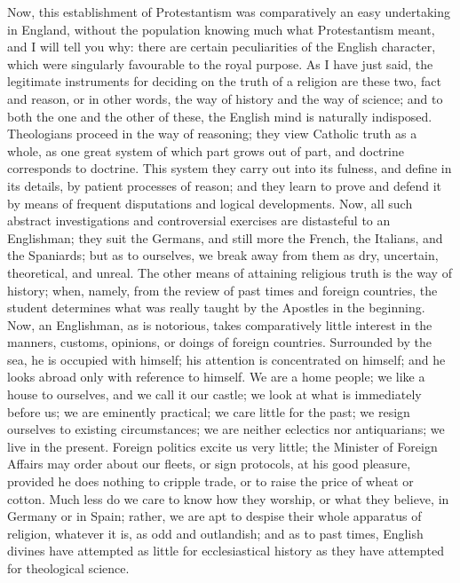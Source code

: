Now, this establishment of Protestantism was
comparatively an easy undertaking in England, without the
population knowing much what Protestantism meant, and I
will tell you why: there are certain peculiarities of the
English character, which were singularly favourable to
the royal purpose. As I have just said, the legitimate
instruments for deciding on the truth of a religion are
these two, fact and reason, or in other words, the way of
history and the way of science; and to both the one and
the other of these, the English mind is naturally
indisposed. Theologians proceed in the way of reasoning;
they view Catholic truth as a whole, as one great system
of which part grows out of part, and doctrine corresponds
to doctrine. This system they carry out into its fulness,
and define in its details, by patient processes of
reason; and they learn to prove and defend it by means of
frequent disputations and logical developments. Now, all
such abstract investigations and controversial exercises
are distasteful to an Englishman; they suit the Germans,
and still more the French, the Italians, and the
Spaniards; but as to ourselves, we break away from them
as dry, uncertain, theoretical, and unreal. The other
means of attaining religious truth is the way of history;
when, namely, from the review of past times and foreign
countries, the student determines what was really taught
by the Apostles in the beginning. Now, an Englishman, as
is notorious, takes comparatively little interest in the
manners, customs, opinions, or doings of foreign
countries. Surrounded by the sea, he is occupied with
himself; his attention is concentrated on himself; and he
looks abroad only with reference to himself. We are a
home people; we like a house to ourselves, and we call it
our castle; we look at what is immediately before us; we
are eminently practical; we care little for the past; we
resign ourselves to existing circumstances; we are
neither eclectics nor antiquarians; we live in the
present. Foreign politics excite us very little; the
Minister of Foreign Affairs may order about our fleets,
or sign protocols, at his good pleasure, provided he does
nothing to cripple trade, or to raise the price of wheat
or cotton. Much less do we care to know how they worship,
or what they believe, in Germany or in Spain; rather, we
are apt to despise their whole apparatus of religion,
whatever it is, as odd and outlandish; and as to past
times, English divines have attempted as little for
ecclesiastical history as they have attempted for
theological science.

